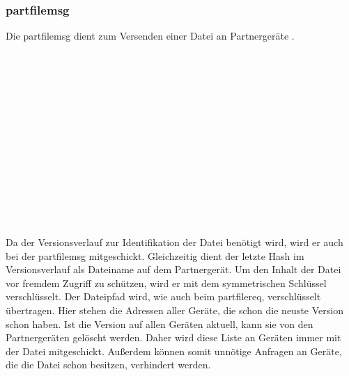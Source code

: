\subsubsection{\gls{partfilemsg}}
Die \gls{partfilemsg} dient zum Versenden einer Datei an Partnergeräte  .
\messagestart
	\begin{rightwordgroup}{\isprotomsgtype}
	\end{rightwordgroup}\\
	
	\begin{rightwordgroup}{\isprotomsgdata}
		 \\
		\skippedwords \\
		 \\
		 \\
		\skippedwords \\
		 \\
		 \\
		\skippedwords \\
		 \\
		 \\
		\skippedwords \\
	\end{rightwordgroup}
\begin{description}
	Da der Versionsverlauf zur Identifikation der Datei benötigt wird, wird er auch bei der \gls{partfilemsg} mitgeschickt. Gleichzeitig dient der letzte Hash im Versionsverlauf als Dateiname auf dem Partnergerät.
	Um den Inhalt der Datei vor fremdem Zugriff zu schützen, wird er mit dem symmetrischen Schlüssel  verschlüsselt. 
	Der Dateipfad wird, wie auch beim \gls{partfilereq}, verschlüsselt übertragen. 
	Hier stehen die Adressen aller Geräte, die schon die neuste Version schon haben. Ist die Version auf allen Geräten aktuell, kann sie von den Partnergeräten gelöscht werden. Daher wird diese Liste an Geräten immer mit der Datei mitgeschickt. Außerdem können somit unnötige Anfragen an Geräte, die die Datei schon besitzen, verhindert werden.
\end{description}

